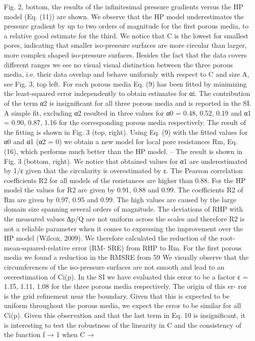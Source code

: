 Fig. 2, bottom, the results of the infinitesimal pressure gradients versus the HP model
(Eq. (11)) are shown. We observe that the HP model underestimates the pressure gradient by up to two orders of magnitude for the first porous media, to a relative good estimate for the third. We notice that C is the lowest for smallest pores, indicating that smaller iso-pressure surfaces are more circular than larger, more complex shaped iso-pressure surfaces. Besides the fact that the data covers different ranges we see no visual visual distinction between the three porous media, i.e. their data overlap and behave uniformly with respect to C and size A, see Fig. 3, top left.
For each porous media Eq. (9) has been fitted by minimizing the least-squared error independently to obtain estimates for αi. The contribution of the term α2 is insignificant for all three porous media and is reported in the SI. A simple fit, excluding α2 resulted in three values for α0 = 0.48, 0.52, 0.19 and α1 = 0.90, 0.87, 1.16 for the corresponding porous media respectively. The result of the fitting is shown in Fig. 3 (top, right). Using Eq. (9) with the fitted values for α0 and α1 (α2 = 0) we obtain a new model for
local pore resistances Rm, Eq. (16), which performs much better than the HP model.
–
The result is shown in Fig. 3 (bottom, right). We notice that obtained values for α1 are underestimated by 1/ε given that the circularity is overestimated by ε.
The Pearson correlation coefficients R2 for all models of the resistances are higher than 0.88. For the HP model the values for R2 are given by 0.91, 0.88 and 0.99. The coefficients R2 of Rm are given by 0.97, 0.95 and 0.99. The high values are caused by the large domain size spanning several orders of magnitude. The deviations of RHP with the measured values ∆p/Q are not uniform across the scales and therefore R2 is not a reliable parameter when it comes to expressing the improvement over the HP model (Wilcox, 2009). We therefore calculated the reduction of the root-mean-squared-relative error (RM- SRE) from RHP to Rm. For the first porous media we found a reduction in the RMSRE from 59%
We visually observe that the circumferences of the iso-pressure surfaces are not smooth and lead to an overestimation of Ci(p). In the SI we have evaluated this error to be a factor ε = 1.15, 1.11, 1.08 for the three porous media respectively. The origin of this er-
ror is the grid refinement near the boundary. Given that this is expected to be uniform throughout the porous media, we expect the error to be similar for all Ci(p). Given this observation and that the last term in Eq. 10 is insignificant, it is interesting to test the robustness of the linearity in C and the consistency of the function f → 1 when C →
